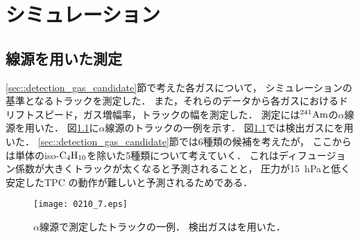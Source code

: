 \documentclass[../master]{subfiles}
\begin{document}
\chapter{シミュレーション}
\label{chap::simulation}
\section{線源を用いた測定}
\ref{sec::detection_gas_candidate}節で考えた各ガスについて，
シミュレーションの基準となるトラックを測定した．
また，それらのデータから各ガスにおけるドリフトスピード，ガス増幅率，トラックの幅を測定した．
測定には${}^{241}{\rm Am}$の$\alpha$線源を用いた．
図\ref{fig::a_source_track}に$\alpha$線源のトラックの一例を示す．
図\ref{fig::a_source_track}では検出ガスに\isoButaneHydro を用いた．
\ref{sec::detection_gas_candidate}節では6種類の候補を考えたが，
ここからは単体のiso-$\rm C_{4}H_{10}$を除いた5種類について考えていく．
これはディフュージョン係数が大きくトラックが太くなると予測されることと，
圧力が\SI{15}{\hecto\pascal}と低く安定したTPC の動作が難しいと予測されるためである．
\begin{figure}
  \centering
  \texttt{[image: 0210\_7.eps]}
  \caption[$\alpha$線源で測定したトラックの一例．]
          {$\alpha$線源で測定したトラックの一例．
          検出ガスは\isoButaneHydro を用いた．}
  \label{fig::a_source_track}
\end{figure}
\end{document}

